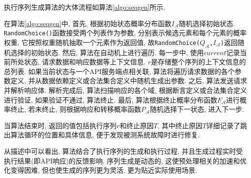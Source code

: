             执行序列生成算法的大体流程如算法\ref{algo:seqgen}所示.
            
            在算法\ref{algo:seqgen}中, 首先, 根据初始状态概率分布函数$I_{\mathcal{A}}$随机选择初始状态. \texttt{RandomChoice()}函数接受两个列表作为参数, 分别表示候选元素和每个元素的概率权重, 它按照权重随机抽取一个元素作为返回值, 故\texttt{RandomChoice(}$Q_{\mathcal{A}}$\texttt{,}$I_{\mathcal{A}}$\texttt{)}返回随机选择的初始状态. 然后, 算法在自动机上进行遍历. 每一步中, 使用$current$记录当前所处状态, 请求数据和响应数据等上下文信息. $r$是存储整个序列的上下文信息的总列表. 如果当前状态与一个API服务端点相关联, 算法将遍历请求数据的各个参数定义, 并从数据依赖定义或合法集合定义中随机生成出参数. 之后, 算法发送请求并解析响应体. 解析完成后, 算法扫描响应的各个域, 根据断言定义或合法集合定义进行验证, 如果验证不通过, 算法终止. 最后, 算法根据终止概率分布函数$F_{\mathcal{A}}$进行概率终止, 若未终止, 则根据响应和转移概率函数$P_{\mathcal{A}}$随机选择下一状态, 进入下一步.
            
            当算法结束时, 返回的值包括执行序列$r$和终止原因$T$, 其中终止原因$T$详细记录了跳出算法循环的位置和具体信息, 便于发现被测系统故障时进行修复.
            
            从描述中可以看出, 算法结合了执行序列的生成和执行过程, 并且生成过程实时受执行结果(即API响应)的反馈影响. 序列生成是动态的, 这使预处理相关的加速和优化变得困难, 但也使生成的序列更为灵活, 更为贴近实际使用场景.
            
